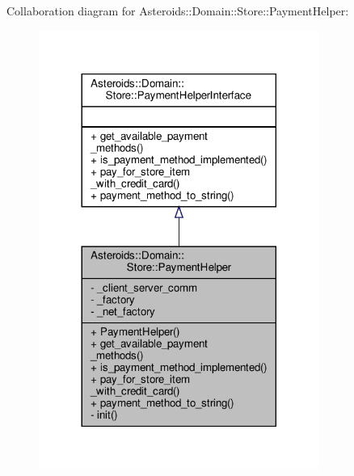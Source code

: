 Collaboration diagram for Asteroids\+:\+:Domain\+:\+:Store\+:\+:Payment\+Helper\+:\nopagebreak
\begin{figure}[H]
\begin{center}
\leavevmode
\includegraphics[width=260pt]{classAsteroids_1_1Domain_1_1Store_1_1PaymentHelper__coll__graph}
\end{center}
\end{figure}
